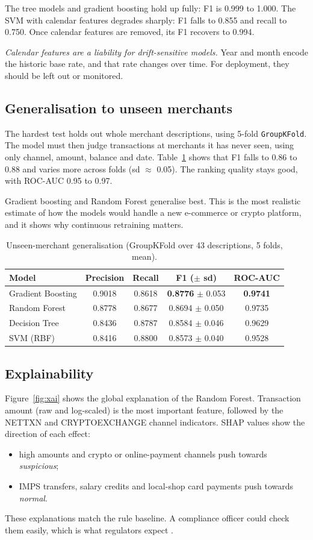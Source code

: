 \documentclass[12pt,a4paper]{article}
\begin{document}
The tree models and gradient boosting hold up fully: F1 is 0.999 to 1.000. The SVM with calendar features degrades sharply: F1 falls to 0.855 and recall to 0.750. Once calendar features are removed, its F1 recovers to 0.994.

\emph{Calendar features are a liability for drift-sensitive models.} Year and month encode the historic base rate, and that rate changes over time. For deployment, they should be left out or monitored.

\subsection{Generalisation to unseen merchants}
The hardest test holds out whole merchant descriptions, using 5-fold \texttt{GroupKFold}. The model must then judge transactions at merchants it has never seen, using only channel, amount, balance and date. Table~\ref{tab:group} shows that F1 falls to 0.86 to 0.88 and varies more across folds (sd $\approx$ 0.05). The ranking quality stays good, with ROC-AUC 0.95 to 0.97.

Gradient boosting and Random Forest generalise best. This is the most realistic estimate of how the models would handle a new e-commerce or crypto platform, and it shows why continuous retraining matters.

\begin{table}[H]
\centering\small
\caption{Unseen-merchant generalisation (GroupKFold over 43 descriptions, 5 folds, mean).}\label{tab:group}
\begin{tabular}{lcccc}
\toprule
Model & Precision & Recall & F1 ($\pm$ sd) & ROC-AUC \\
\midrule
Gradient Boosting & 0.9018 & 0.8618 & \textbf{0.8776} $\pm$ 0.053 & \textbf{0.9741} \\
Random Forest & 0.8778 & 0.8677 & 0.8694 $\pm$ 0.050 & 0.9735 \\
Decision Tree & 0.8436 & 0.8787 & 0.8584 $\pm$ 0.046 & 0.9629 \\
SVM (RBF) & 0.8416 & 0.8800 & 0.8573 $\pm$ 0.040 & 0.9528 \\
\bottomrule
\end{tabular}
\end{table}

\subsection{Explainability}
Figure~\ref{fig:xai} shows the global explanation of the Random Forest. Transaction amount (raw and log-scaled) is the most important feature, followed by the NETTXN and CRYPTOEXCHANGE channel indicators. SHAP values show the direction of each effect:
\begin{itemize}[nosep]
\item high amounts and crypto or online-payment channels push towards \emph{suspicious};
\item IMPS transfers, salary credits and local-shop card payments push towards \emph{normal}.
\end{itemize}
These explanations match the rule baseline. A compliance officer could check them easily, which is what regulators expect \citep{euaiact2024}.
\end{document}
